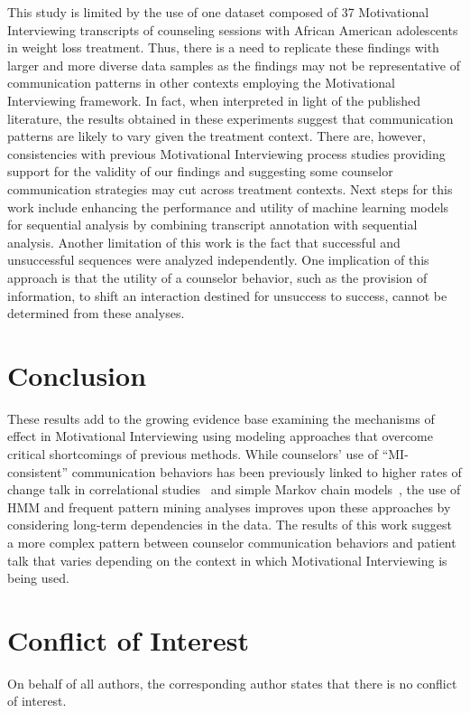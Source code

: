 \documentclass[smallextended]{svjour3}       %
\begin{document}
This study is limited by the use of one dataset composed of 37 Motivational Interviewing transcripts of counseling sessions with African American adolescents in weight loss treatment. Thus, there is a need to replicate these findings with larger and more diverse data samples as the findings may not be representative of communication patterns in other contexts employing the Motivational Interviewing framework. In fact, when interpreted in light of the published literature, the results obtained in these experiments suggest that communication patterns are likely to vary given the treatment context. There are, however, consistencies with previous Motivational Interviewing process studies providing support for the validity of our findings and suggesting some counselor communication strategies may cut across treatment contexts. Next steps for this work include enhancing the performance and utility of machine learning models for sequential analysis by combining transcript annotation with sequential analysis. Another limitation of this work is the fact that successful and unsuccessful sequences were analyzed independently. One implication of this approach is that the utility of a counselor behavior, such as the provision of information, to shift an interaction destined for unsuccess to success, cannot be determined from these analyses.

\section{Conclusion}
\label{sec:conclusion}
These results add to the growing evidence base examining the mechanisms of effect in Motivational Interviewing using modeling approaches that overcome critical shortcomings of previous methods. While counselors' use of ``MI-consistent'' communication behaviors has been previously linked to higher rates of change talk in correlational studies~\cite{moyers2006therapist, catley2006adherence, thrasher2006motivational, mccambridge2011fidelity} and simple Markov chain models~\cite{moyers2006therapist, moyers2009session, gaume2010counselor}, the use of HMM and frequent pattern mining analyses improves upon these approaches by considering long-term dependencies in the data. The results of this work suggest a more complex pattern between counselor communication behaviors and patient talk that varies depending on the context in which Motivational Interviewing is being used.  

\section{Conflict of Interest}
\label{sec:conflictofInterest}
On behalf of all authors, the corresponding author states that there is no conflict of interest.
\end{document}
